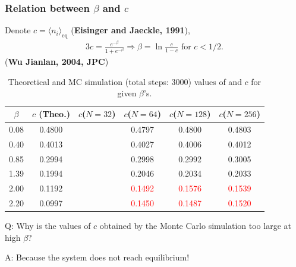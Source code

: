 \documentclass[8pt]{beamer}
\begin{document}
\begin{frame}
	\frametitle{Relation between $\beta$ and $c$}
	Denote $c = \langle n_i \rangle_{\text{eq}}$ (\textbf{Eisinger and Jaeckle, 1991}),
	\begin{alignat}{3}
		c= \frac{e^{-\beta}}{1+ e^{-\beta}} \Rightarrow \beta = \ln \frac{c}{1-c} \text{ for } c < 1/2.
	\end{alignat}
	(\textbf{Wu Jianlan, 2004, JPC})	
	\begin{table}[htbp]
		\centering
				\caption{\label{tab:table_lino3} Theoretical and MC simulation (total steps: 3000) values of and $c$ for given $\beta$'s.}
		\begin{tabular}{cccccc}
			$\beta$ & $c$ (Theo.) & $c$($N=32$) & $c$($N=64$) & $c$($N=128$) &$c$($N=256$) \\
			\hline
			0.08 & 0.4800  & & 0.4797 & 0.4800 & 0.4803 \\
			0.40 & 0.4013 & & 0.4027 & 0.4006 & 0.4012 \\
			0.85 & 0.2994 & & 0.2998 & 0.2992  & 0.3005 \\
			1.39 & 0.1994 & & 0.2046 & 0.2034 & 0.2033 \\
			2.00 & 0.1192 & & \textcolor{red}{0.1492} & \textcolor{red}{0.1576} & \textcolor{red}{0.1539}\\
			2.20 & 0.0997 & &  \textcolor{red}{0.1450} & \textcolor{red}{0.1487} & \textcolor{red}{0.1520}
		\end{tabular}
	\end{table}
	Q: Why is the values of $c$ obtained by the Monte Carlo simulation too large at high $\beta$? 
	
	A: Because the system does not reach equilibrium! 
\end{frame}
\end{document}
